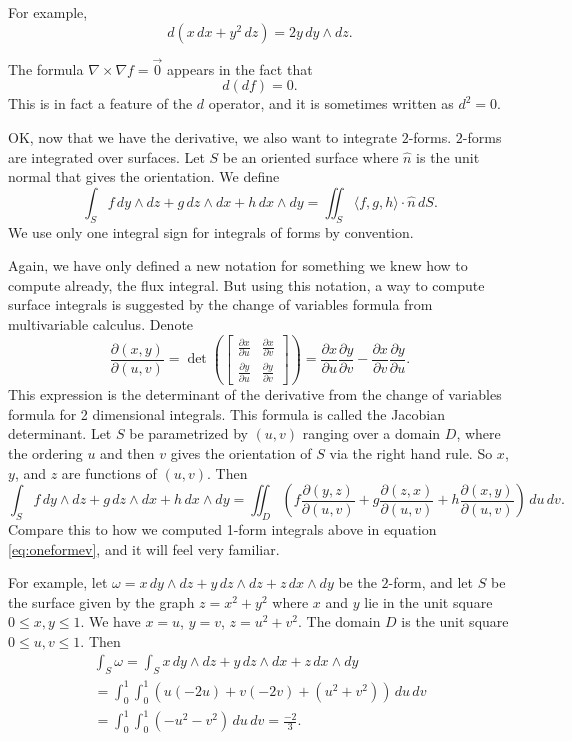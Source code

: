 \documentclass[12pt]{article}
\begin{document}
For example,
\[
d( x \, dx + y^2 \, dz)
=
2 y \, dy \wedge dz .
\]

The formula $\nabla \times \nabla f = \vec{0}$ appears in the fact that
\[
d(df) = 0 .
\]
This is in fact a feature of the $d$ operator, and it is sometimes
written as $d^2 = 0$.

OK, now that we have the derivative, we also want to integrate $2$-forms.
$2$-forms are integrated over surfaces.  Let $S$ be an oriented surface
where $\hat{n}$ is the unit normal that gives the orientation.
We define
\[
\int_S
f\, dy \wedge dz + 
g\, dz \wedge dx +
h\, dx \wedge dy
=
\iint_S \langle f, g, h \rangle \cdot \hat{n} \, dS .
\]
We use only one integral sign for integrals of forms by convention.

Again, we have only defined a new notation for something we knew how to compute already,
the flux integral.  But using this notation,
a way to compute surface integrals is suggested by the change of
variables formula from multivariable calculus.
Denote
\[
\frac{\partial (x,y)}{\partial (u,v)}
=
\det \left(
\begin{bmatrix}
\frac{\partial x}{\partial u}
&
\frac{\partial x}{\partial v}
\\[3pt]
\frac{\partial y}{\partial u} 
&
\frac{\partial y}{\partial v}
\end{bmatrix}
\right)
=
\frac{\partial x}{\partial u}
\frac{\partial y}{\partial v}
-
\frac{\partial x}{\partial v}
\frac{\partial y}{\partial u} .
\]
This expression is the determinant of the derivative from the
change of variables formula for 2 dimensional integrals.
This formula is called the Jacobian determinant.
Let $S$ be parametrized by $(u,v)$ ranging over a domain $D$,
where the ordering $u$ and then $v$
gives the orientation of $S$ via the right hand rule.
So $x$, $y$, and $z$ are functions of $(u,v)$.
Then
\begin{equation*}
\int_S
f\, dy \wedge dz + 
g\, dz \wedge dx +
h\, dx \wedge dy
=
\iint_D
\left(
f 
\frac{\partial (y,z)}{\partial (u,v)}
+
g
\frac{\partial (z,x)}{\partial (u,v)}
+
h
\frac{\partial (x,y)}{\partial (u,v)}
\right)
\,
du\, dv .
\end{equation*}
Compare this to how we computed 1-form integrals above in
equation \eqref{eq:oneformev}, and it will feel very familiar.

For example, let $\omega = x \, dy \wedge dz + y \, dz \wedge dz
+ z \, dx \wedge dy$ be the
$2$-form, and let
$S$ be the surface given by the graph $z=x^2+y^2$ where $x$ and $y$ lie in
the unit square $0 \leq x,y \leq 1$.  We have $x=u$, $y=v$, $z=u^2+v^2$.
The domain $D$ is the unit square $0 \leq u,v \leq 1$.  Then
\begin{multline*}
\int_S \omega =
\int_S
x\, dy \wedge dz + 
y\, dz \wedge dx +
z\, dx \wedge dy
\\
=
\int_0^1 \int_0^1
\left(
u 
(-2u)
+
v
(-2v)
+
(u^2+v^2)
\right)
\,
du\, dv 
\\
=
\int_0^1 \int_0^1
(-u^2-v^2)
\,
du\, dv 
=
\frac{-2}{3} .
\end{multline*}
\end{document}
